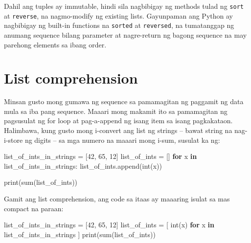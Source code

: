 \documentclass[10pt,]{book}
\newenvironment{Shaded}{}{}
\newcommand{\BuiltInTok}[1]{\textcolor[rgb]{0.00,0.50,0.00}{#1}}
\newcommand{\ControlFlowTok}[1]{\textcolor[rgb]{0.00,0.44,0.13}{\textbf{#1}}}
\newcommand{\KeywordTok}[1]{\textcolor[rgb]{0.00,0.44,0.13}{\textbf{#1}}}
\newcommand{\NormalTok}[1]{#1}
\newcommand{\OperatorTok}[1]{\textcolor[rgb]{0.40,0.40,0.40}{#1}}
\newcommand{\StringTok}[1]{\textcolor[rgb]{0.25,0.44,0.63}{#1}}
\begin{document}
Dahil ang tuples ay immutable, hindi sila nagbibigay ng methods tulad ng
\texttt{sort} at \texttt{reverse}, na nagmo-modify ng existing lists.
Gayunpaman ang Python ay nagbibigay ng built-in functions na
\texttt{sorted} at \texttt{reversed}, na tumatanggap ng anumang sequence
bilang parameter at nagre-return ng bagong sequence na may parehong
elements sa ibang order.

 
 

\section{List comprehension}\label{list-comprehension}

Minsan gusto mong gumawa ng sequence sa pamamagitan ng paggamit ng data
mula sa iba pang sequence. Maaari mong makamit ito sa pamamagitan ng
pagsusulat ng for loop at pag-a-append ng isang item sa isang
pagkakataon. Halimbawa, kung gusto mong i-convert ang list ng strings --
bawat string na nag-i-store ng digits -- sa mga numero na maaari mong
i-sum, susulat ka ng:

\begin{Shaded}
\begin{Highlighting}[]
\NormalTok{list\_of\_ints\_in\_strings }\OperatorTok{=}\NormalTok{ [}\StringTok{\textquotesingle{}42\textquotesingle{}}\NormalTok{, }\StringTok{\textquotesingle{}65\textquotesingle{}}\NormalTok{, }\StringTok{\textquotesingle{}12\textquotesingle{}}\NormalTok{]}
\NormalTok{list\_of\_ints }\OperatorTok{=}\NormalTok{ []}
\ControlFlowTok{for}\NormalTok{ x }\KeywordTok{in}\NormalTok{ list\_of\_ints\_in\_strings:}
\NormalTok{    list\_of\_ints.append(}\BuiltInTok{int}\NormalTok{(x))}

\BuiltInTok{print}\NormalTok{(}\BuiltInTok{sum}\NormalTok{(list\_of\_ints))}
\end{Highlighting}
\end{Shaded}

Gamit ang list comprehension, ang code sa itaas ay maaaring isulat sa
mas compact na paraan:

\begin{Shaded}
\begin{Highlighting}[]
\NormalTok{list\_of\_ints\_in\_strings }\OperatorTok{=}\NormalTok{ [}\StringTok{\textquotesingle{}42\textquotesingle{}}\NormalTok{, }\StringTok{\textquotesingle{}65\textquotesingle{}}\NormalTok{, }\StringTok{\textquotesingle{}12\textquotesingle{}}\NormalTok{]}
\NormalTok{list\_of\_ints }\OperatorTok{=}\NormalTok{ [ }\BuiltInTok{int}\NormalTok{(x) }\ControlFlowTok{for}\NormalTok{ x }\KeywordTok{in}\NormalTok{ list\_of\_ints\_in\_strings ]}
\BuiltInTok{print}\NormalTok{(}\BuiltInTok{sum}\NormalTok{(list\_of\_ints))}
\end{Highlighting}
\end{Shaded}
\end{document}
